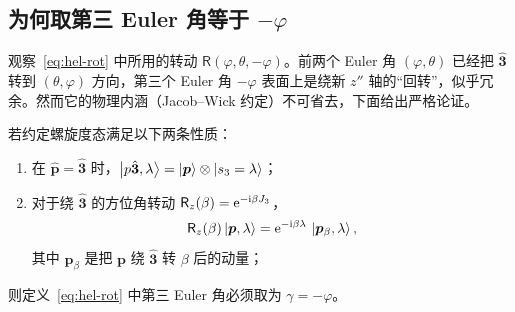 \subsection{为何取第三 Euler 角等于 $-\varphi$}
\label{subsec:morespin-jacobwick}

观察~\eqref{eq:hel-rot} 中所用的转动 $\mathsf R(\varphi,\theta,-\varphi)$。前两个 Euler 角 $(\varphi,\theta)$ 已经把 $\hat{\bm 3}$ 转到 $(\theta,\varphi)$ 方向，第三个 Euler 角 $-\varphi$ 表面上是绕新 $z''$ 轴的“回转”，似乎冗余。然而它的物理内涵（Jacob--Wick 约定）不可省去，下面给出严格论证。

\begin{theorem}
\label{thm:morespin-jacobwick}
若约定螺旋度态满足以下两条性质：
\begin{enumerate}
\item[(JW1)] 在 $\hat{\bm p}=\hat{\bm 3}$ 时，$\ket{p\hat{\bm 3},\lambda}=\ket{\bm p}\otimes\ket{s_3=\lambda}$；
\item[(JW2)] 对于绕 $\hat{\bm 3}$ 的方位角转动 $\mathsf R_z(\beta)=\mathrm{e}^{-\mathrm{i}\beta J_3}$，
$$
\mathsf R_z(\beta)\ket{\bm p,\lambda}=\mathrm{e}^{-\mathrm{i}\beta\lambda}\,\ket{\bm p_\beta,\lambda},
$$
其中 $\bm p_\beta$ 是把 $\bm p$ 绕 $\hat{\bm 3}$ 转 $\beta$ 后的动量；
\end{enumerate}
则定义~\eqref{eq:hel-rot} 中第三 Euler 角必须取为 $\gamma=-\varphi$。
\end{theorem}

